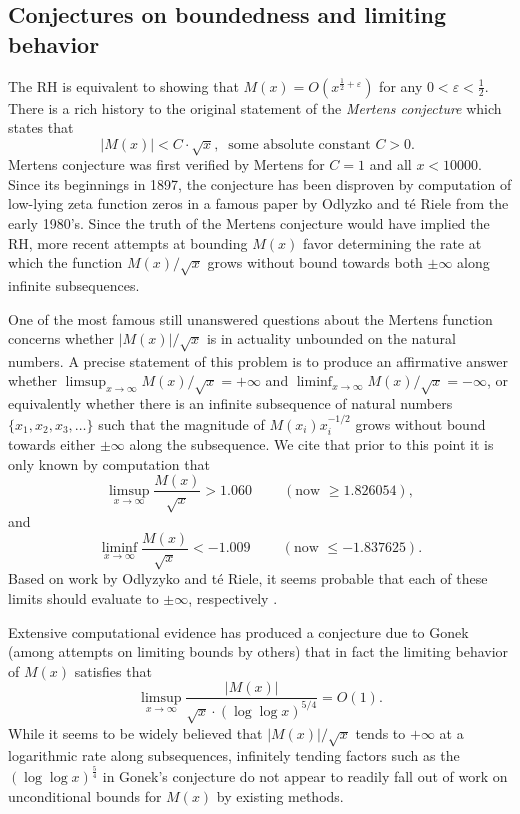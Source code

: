\documentclass[11pt,reqno,a4letter]{article}
\numberwithin{figure}{section}
\numberwithin{table}{section}
\newcommand{\cf}{\textit{cf.\ }}
\theoremstyle{plain}
\numberwithin{theorem}{section}
\theoremstyle{definition}
\begin{document}
\subsection{Conjectures on boundedness and limiting behavior} 

The RH is equivalent to showing that 
$M(x) = O\left(x^{\frac{1}{2}+\varepsilon}\right)$ for any 
$0 < \varepsilon < \frac{1}{2}$. 
There is a rich history to the original statement of the \emph{Mertens conjecture} which 
states that 
\[ 
|M(x)| < C \cdot \sqrt{x},\ \text{ some absolute constant $C > 0$. }
\] 
Mertens conjecture was first verified by Mertens for $C = 1$ and all $x < 10000$. 
Since its beginnings in 1897, the conjecture has been disproven by computation 
of low-lying zeta function zeros in a famous paper by 
Odlyzko and t\'{e} Riele from the early 1980's. 
Since the truth of the Mertens conjecture would have implied the RH, more recent attempts 
at bounding $M(x)$ favor determining the rate at which the function 
$M(x) / \sqrt{x}$ grows without bound towards both $\pm \infty$ along infinite 
subsequences. 

One of the most famous still unanswered questions about the Mertens 
function concerns whether $|M(x)| / \sqrt{x}$ is in actuality unbounded on the 
natural numbers. A precise statement of this 
problem is to produce an affirmative answer whether 
$\limsup_{x \rightarrow \infty} M(x) / \sqrt{x} = +\infty$ and 
$\liminf_{x \rightarrow \infty} M(x) / \sqrt{x} = -\infty$, or 
equivalently whether there is an infinite subsequence of natural numbers 
$\{x_1, x_2, x_3, \ldots\}$ such that the magnitude of 
$M(x_i) x_i^{-1/2}$ grows without bound towards either $\pm \infty$ 
along the subsequence. 
We cite that prior to this point it is only known by computation 
that \cite[\cf \S 4.1]{PRIMEREC} 
\[
\limsup_{x\rightarrow\infty} \frac{M(x)}{\sqrt{x}} > 1.060\ \qquad (\text{now } \geq 1.826054), 
\] 
and 
\[ 
\liminf_{x\rightarrow\infty} \frac{M(x)}{\sqrt{x}} < -1.009\ \qquad (\text{now } \leq -1.837625). 
\] 
Based on work by Odlyzyko and t\'{e} Riele, it seems probable that 
each of these limits should evaluate to $\pm \infty$, respectively 
\cite{ODLYZ-TRIELE,MREVISITED,ORDER-MERTENSFN,HURST-2017}. 

Extensive computational evidence has produced 
a conjecture due to Gonek (among attempts on limiting bounds by others) that in fact the limiting behavior of 
$M(x)$ satisfies that \cite{NG-MERTENS}
$$\limsup_{x \rightarrow \infty} \frac{|M(x)|}{\sqrt{x} \cdot (\log\log x)^{5/4}} = O(1).$$ 
While it seems to be widely believed that $|M(x)| / \sqrt{x}$ tends to $+\infty$ at a logarithmic rate 
along subsequences, infinitely tending factors such as the $(\log\log x)^{\frac{5}{4}}$ in Gonek's conjecture 
do not appear to readily fall out of work on unconditional bounds for $M(x)$ by existing methods. 
\end{document}
